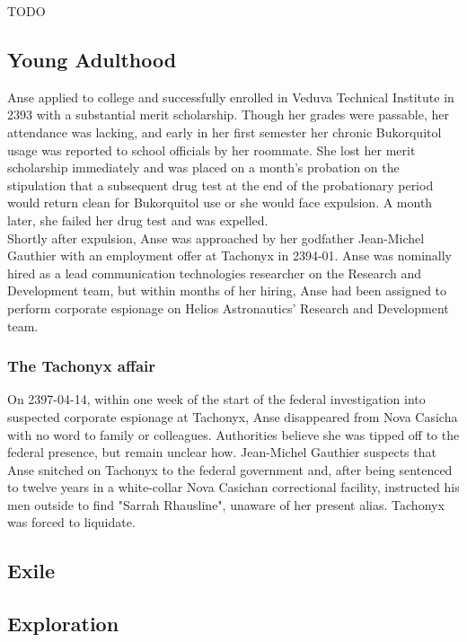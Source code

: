 \documentclass[12pt,a4paper,twocolumn]{article}
\begin{document}
	TODO\\
	
	\subsection{Young Adulthood}
	\indent Anse applied to college and successfully enrolled in Veduva Technical Institute in 2393 with a substantial merit scholarship. Though her grades were passable, her attendance was lacking, and early in her first semester her chronic Bukorquitol usage was reported to school officials by her roommate. She lost her merit scholarship immediately and was placed on a month's probation on the stipulation that a subsequent drug test at the end of the probationary period would return clean for Bukorquitol use or she would face expulsion. A month later, she failed her drug test and was expelled.\\
\indent Shortly after expulsion, Anse was approached by her godfather Jean-Michel Gauthier with an employment offer at Tachonyx in 2394-01. Anse was nominally hired as a lead communication technologies researcher on the Research and Development team, but within months of her hiring, Anse had been assigned to perform corporate espionage on Helios Astronautics' Research and Development team.

	\subsubsection{The Tachonyx affair}
\indent On 2397-04-14, within one week of the start of the federal investigation into suspected corporate espionage at Tachonyx, Anse disappeared from Nova Casicha with no word to family or colleagues. Authorities believe she was tipped off to the federal presence, but remain unclear how. Jean-Michel Gauthier suspects that Anse snitched on Tachonyx to the federal government and, after being sentenced to twelve years in a white-collar Nova Casichan correctional facility, instructed his men outside to find "Sarrah Rhausline", unaware of her present alias. Tachonyx was forced to liquidate.
	
	
	\subsection{Exile}
	
	
	
	
	\subsection{Exploration}
	
\end{document}
